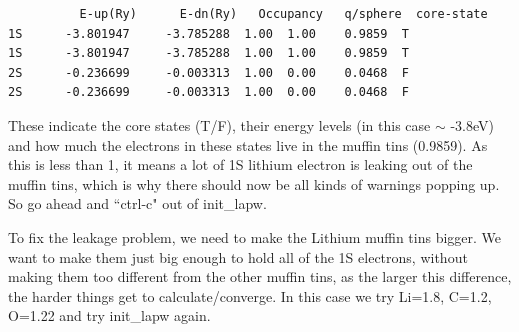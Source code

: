 \documentclass[12pt]{article}
\begin{document}
\begin{itemize}
	\begin{lstlisting}
          E-up(Ry)      E-dn(Ry)   Occupancy   q/sphere  core-state
1S      -3.801947     -3.785288  1.00  1.00    0.9859  T
1S      -3.801947     -3.785288  1.00  1.00    0.9859  T
2S      -0.236699     -0.003313  1.00  0.00    0.0468  F
2S      -0.236699     -0.003313  1.00  0.00    0.0468  F
	\end{lstlisting}
	
	These indicate the core states (T/F), their energy levels (in this case $\sim$ -3.8eV) and how much the electrons in these states live in the muffin tins (0.9859).  As this is less than 1, it means a lot of 1S lithium electron is leaking out of the muffin tins, which is why there should now be all kinds of warnings popping up.  So go ahead and ``ctrl-c" out of init\_lapw.
	
\end{itemize}  

To fix the leakage problem, we need to make the Lithium muffin tins bigger. We want to make them just big enough to hold all of the 1S electrons, without making them too different from the other muffin tins, as the larger this difference, the harder things get to calculate/converge.  In this case we try Li=1.8,  C=1.2, O=1.22 and try init\_lapw again.  
\end{document}
